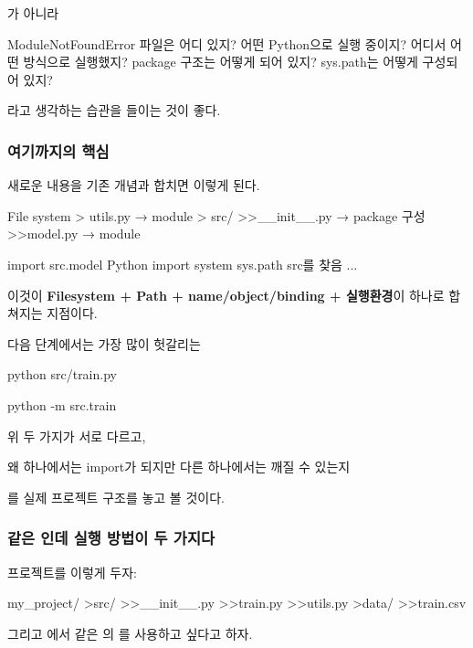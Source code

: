가 아니라

\begin{dhksmry}[centered]
ModuleNotFoundError
\da
파일은 어디 있지?
\da
어떤 Python으로 실행 중이지?
\da
어디서 어떤 방식으로 실행했지?
\da
package 구조는 어떻게 되어 있지?
\da
sys.path는 어떻게 구성되어 있지?
\end{dhksmry}

라고 생각하는 습관을 들이는 것이 좋다.

\subsubsection{여기까지의 핵심}

새로운 내용을 기존 개념과 합치면 이렇게 된다.

\begin{dhkdir}[in=6]
File system
> utils.py → module
> src/
>>__init__.py → package 구성
>>model.py → module
\end{dhkdir}

\begin{dhksmry}[centered]
import src.model
\da
Python import system
\da
sys.path
\da
src를 찾음
\da
...
\end{dhksmry}

이것이 \textbf{Filesystem + Path + name/object/binding + 실행환경}이 하나로 합쳐지는 지점이다.

다음 단계에서는 가장 많이 헛갈리는

\begin{dhkzsh}
python src/train.py

python -m src.train
\end{dhkzsh}

위 두 가지가 서로 다르고, 

왜 하나에서는 import가 되지만 다른 하나에서는 깨질 수 있는지

를 실제 프로젝트 구조를 놓고 볼 것이다.

\subsubsection{같은 인데 실행 방법이 두 가지다}

프로젝트를 이렇게 두자:

\begin{dhkdir}
my_project/
>src/
>>__init__.py
>>train.py
>>utils.py
>data/
>>train.csv
\end{dhkdir}

그리고 에서 같은 의 를 사용하고 싶다고 하자.

